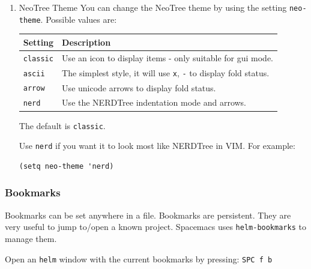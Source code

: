\documentclass[11pt]{article}
\begin{document}
\begin{enumerate}
The default is \texttt{nil} (do not show source control information), which is recommended.

For example,

\begin{verbatim}
(setq neo-vc-integration 'face)
\end{verbatim}

\textbf{Note}: At this time, it is not recommended to set this to anything other
than \texttt{nil}.  Otherwise, it will become very slow with larger source trees.
See \url{https://github.com/jaypei/emacs-neotree/issues/126} for more information.

\item NeoTree Theme
\label{sec:orge5e2b3c}
You can change the NeoTree theme by using the setting \texttt{neo-theme}.  Possible
values are:

\begin{center}
\begin{tabular}{ll}
Setting & Description\\
\hline
\texttt{classic} & Use an icon to display items - only suitable for gui mode.\\
\texttt{ascii} & The simplest style, it will use \texttt{x}, \texttt{-} to display fold status.\\
\texttt{arrow} & Use unicode arrows to display fold status.\\
\texttt{nerd} & Use the NERDTree indentation mode and arrows.\\
\end{tabular}
\end{center}

The default is \texttt{classic}.

Use \texttt{nerd} if you want it to look most like NERDTree in VIM.  For example:

\begin{verbatim}
(setq neo-theme 'nerd)
\end{verbatim}
\end{enumerate}

\subsubsection{Bookmarks}
\label{sec:org41395bc}
Bookmarks can be set anywhere in a file. Bookmarks are persistent. They are very
useful to jump to/open a known project. Spacemacs uses \texttt{helm-bookmarks} to
manage them.

Open an \texttt{helm} window with the current bookmarks by pressing: \texttt{SPC f b}
\end{document}
